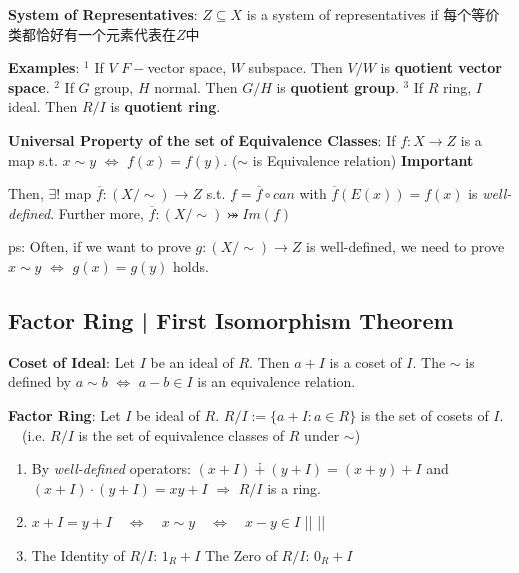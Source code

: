 \documentclass[9pt]{article}
\begin{document}
\quad \textbf{System of Representatives}: $Z\subseteq X$ is a system of representatives if {\footnotesize 每个等价类都恰好有一个元素代表在$Z$中}

\quad \textbf{Examples}: {\tiny $^1$ If $V$ $F-$vector space, $W$ subspace. Then $V/W$ is \textbf{quotient vector space}. \quad $^2$ If $G$ group, $H$ normal. Then $G/H$ is \textbf{quotient group}. \quad $^3$ If $R$ ring, $I$ ideal. Then $R/I$ is \textbf{quotient ring}.}

\textbf{Universal Property of the set of Equivalence Classes}: If $f:X\to Z$ is a map s.t. $x\sim y$ $\Leftrightarrow$ $f(x)=f(y)$. {\tiny ($\sim$ is Equivalence relation) \textbf{Important}}

\quad Then, $\exists!$ map $\overline{f}:(X/\sim)\to Z$ s.t. $f=\overline{f}\circ can$ \quad with \quad $\overline{f}(E(x))=f(x)$ is \textit{well-defined}. \qquad Further more, $\overline{f}:(X/\sim)\bij Im(f)$

\quad ps: Often, if we want to prove $g:(X/\sim)\to Z$ is well-defined, we need to prove $x\sim y$ $\Leftrightarrow$ $g(x)=g(y)$ holds.


\subsection{Factor Ring | First Isomorphism Theorem} %

\textbf{Coset of Ideal}: Let $I$ be an ideal of $R$. Then $a+I$ is a coset of $I$. \quad The $\sim$ is defined by $a\sim b$ $\Leftrightarrow$ $a-b\in I$ is an equivalence relation.

\textbf{Factor Ring}: Let $I$ be ideal of $R$. $R/I:=\{a+I:a\in R\}$ is the set of cosets of $I$. \ \ {\small (i.e. $R/I$ is the set of equivalence classes of $R$ under $\sim$) }

\begin{enumerate}[itemsep=-2pt, topsep=-2pt]
    \item By \textit{well-defined} operators: $(x+I)\dotplus(y+I)=(x+y) + I$ and $(x+I)\cdot(y+I)=xy+I$ \quad $\Rightarrow$ \quad $R/I$ is a ring.
    \item $x+I=y+I \quad \Leftrightarrow \quad x\sim y \quad \Leftrightarrow \quad x-y\in I$ \qquad ||  \qquad || 
    \item The Identity of $R/I$: $1_R+I$ \quad The Zero of $R/I$: $0_R+I$
\end{enumerate}
\end{document}
